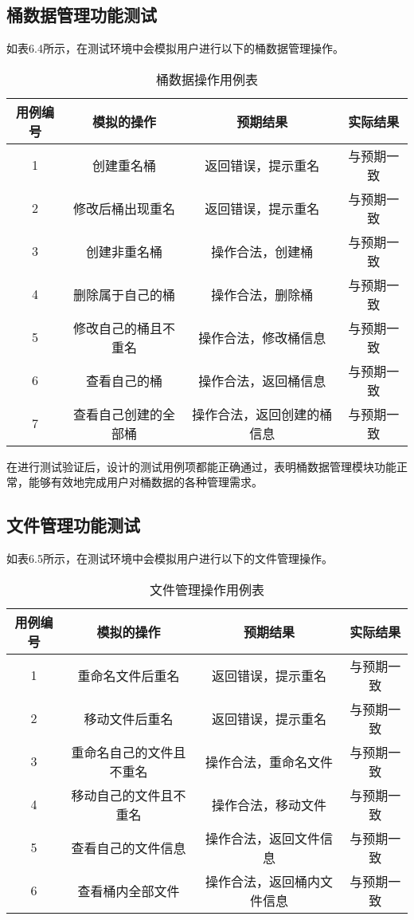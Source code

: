 \subsection{桶数据管理功能测试}

如表6.4所示，在测试环境中会模拟用户进行以下的桶数据管理操作。

\begin{table}[h]
  \centering
  \caption{桶数据操作用例表}
  \begin{tabular}{cccc}
    \toprule
    用例编号 & 模拟的操作   & 预期结果  & 实际结果 \\
    \midrule
    1 & 创建重名桶           & 返回错误，提示重名         & 与预期一致\\
    2 & 修改后桶出现重名      & 返回错误，提示重名         & 与预期一致\\
    3 & 创建非重名桶          & 操作合法，创建桶          & 与预期一致\\
    4 & 删除属于自己的桶      & 操作合法，删除桶           & 与预期一致\\
    5 & 修改自己的桶且不重名   & 操作合法，修改桶信息       & 与预期一致\\
    6 & 查看自己的桶          & 操作合法，返回桶信息       & 与预期一致\\
    7 & 查看自己创建的全部桶   & 操作合法，返回创建的桶信息  & 与预期一致\\
    \bottomrule
  \end{tabular}
\end{table}

在进行测试验证后，设计的测试用例项都能正确通过，表明桶数据管理模块功能正常，能够有效地完成用户对桶数据的各种管理需求。

\subsection{文件管理功能测试}

如表6.5所示，在测试环境中会模拟用户进行以下的文件管理操作。

\begin{table}[h]
  \centering
  \caption{文件管理操作用例表}
  \begin{tabular}{cccc}
    \toprule
    用例编号 & 模拟的操作   & 预期结果  & 实际结果 \\
    \midrule
    1 & 重命名文件后重名          & 返回错误，提示重名      & 与预期一致\\
    2 & 移动文件后重名            & 返回错误，提示重名      & 与预期一致\\
    3 & 重命名自己的文件且不重名   & 操作合法，重命名文件     & 与预期一致\\
    4 & 移动自己的文件且不重名     & 操作合法，移动文件       & 与预期一致\\
    5 & 查看自己的文件信息        & 操作合法，返回文件信息    & 与预期一致\\
    6 & 查看桶内全部文件          & 操作合法，返回桶内文件信息 & 与预期一致\\
    \bottomrule
  \end{tabular}
\end{table}

